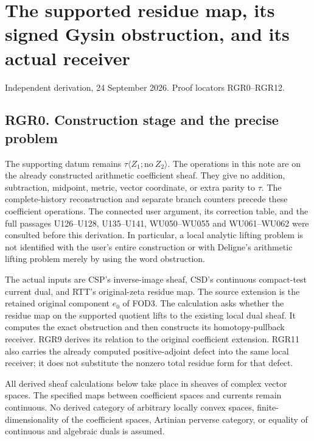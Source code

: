 \section{The supported residue map, its signed Gysin obstruction, and
its actual
receiver}\label{the-supported-residue-map-its-signed-gysin-obstruction-and-its-actual-receiver}

Independent derivation, 24 September 2026. Proof locators RGR0--RGR12.

\subsection{RGR0. Construction stage and the precise
problem}\label{rgr0.-construction-stage-and-the-precise-problem}

The supporting datum remains
\(\tau\langle Z_1;\mathrm{no}\ Z_2\rangle\). The operations in this note
are on the already constructed arithmetic coefficient sheaf. They give
no addition, subtraction, midpoint, metric, vector coordinate, or extra
parity to \(\tau\). The complete-history reconstruction and separate
branch counters precede these coefficient operations. The connected user
argument, its correction table, and the full passages U126--U128,
U135--U141, WU050--WU055 and WU061--WU062 were consulted before this
derivation. In particular, a local analytic lifting problem is not
identified with the user's entire construction or with Deligne's
arithmetic lifting problem merely by using the word obstruction.

The actual inputs are CSP's inverse-image sheaf, CSD's continuous
compact-test current dual, and RTT's original-zeta residue map. The
source extension is the retained original component \(e_0\) of FOD3. The
calculation asks whether the residue map on the supported quotient lifts
to the existing local dual sheaf. It computes the exact obstruction and
then constructs its homotopy-pullback receiver. RGR9 derives its
relation to the original coefficient extension. RGR11 also carries the
already computed positive-adjoint defect into the same local receiver;
it does not substitute the nonzero total residue form for that defect.

All derived sheaf calculations below take place in sheaves of complex
vector spaces. The specified maps between coefficient spaces and
currents remain continuous. No derived category of arbitrary locally
convex spaces, finite-dimensionality of the coefficient spaces, Artinian
perverse category, or equality of continuous and algebraic duals is
assumed.

